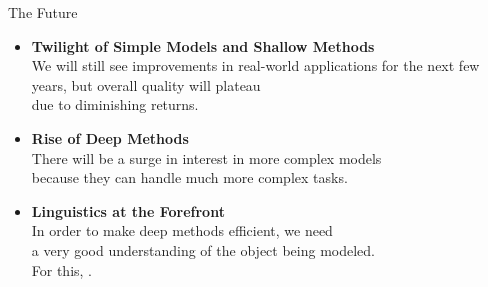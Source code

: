 \documentclass[xcolor={usenames,svgnames,x11names,dvipsnames,table}]{beamer}
\begin{document}
\begin{frame}{The Future}
    \begin{itemize}
        \item \textbf{Twilight of Simple Models and Shallow Methods}\\
            We will still see improvements in real-world applications for the next few years, but overall quality will plateau\\
            due to diminishing returns.
        \item \textbf{Rise of Deep Methods}\\
            There will be a surge in interest in more complex models\\
            because they can handle much more complex tasks.
        \item \textbf{Linguistics at the Forefront}\\
            In order to make deep methods efficient, we need\\
            a very good understanding of the object being modeled.\\
            For this, . 
    \end{itemize}
\end{frame}
\end{document}
